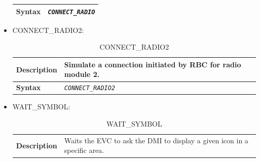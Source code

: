 \documentclass{template/openetcs}
\begin{document}
\begin{itemize}
\begin{longtable}{|l|l|}
					\begin{minipage}[t]{0.22\linewidth} \textbf{Syntax} \end{minipage}
				&	\begin{minipage}[t]{0.78\linewidth} \emph{\texttt{CONNECT\_RADIO}} \end{minipage} \\
				
				\hline \hline
				
			\end{longtable}
			
		\item CONNECT\_RADIO2:

			\begin{longtable}{|l|l|}
				\caption{CONNECT\_RADIO2}\\ 
				\hline
				
					\begin{minipage}[t]{0.22\linewidth} \textbf{Description} \end{minipage} 
				&	\begin{minipage}[t]{0.78\linewidth} Simulate a connection initiated by RBC for radio module 2. \end{minipage} \\
				
				\hline
				
					\begin{minipage}[t]{0.22\linewidth} \textbf{Syntax}	\end{minipage}
				&	\begin{minipage}[t]{0.78\linewidth} \emph{\texttt{CONNECT\_RADIO2}} \end{minipage} \\
				
				\hline \hline
				
			\end{longtable}
			
		\item WAIT\_SYMBOL:
																
			\begin{longtable}{|l|l|}
				\caption{WAIT\_SYMBOL}\\ 
				\hline
				
					\begin{minipage}[t]{0.22\linewidth} \textbf{Description} \end{minipage} 
				&	\begin{minipage}[t]{0.78\linewidth} Waits the EVC to ask the DMI to display a given icon in a specific area. \end{minipage} \\
				

\end{longtable}
\end{itemize}
\end{document}
